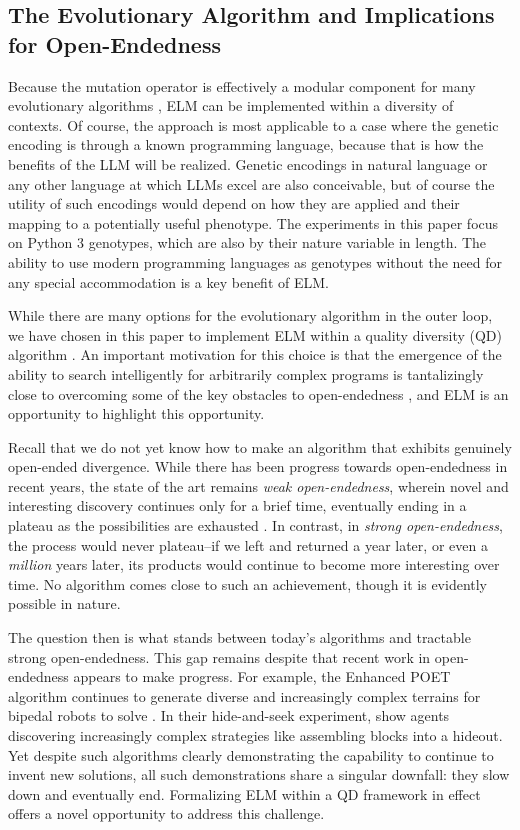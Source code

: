 \documentclass{article}
\begin{document}
\subsection{The Evolutionary Algorithm and Implications for Open-Endedness}

Because the mutation operator is effectively a modular component for many evolutionary algorithms \cite{mitchell:book99,dejong:book06}, ELM can be implemented within a diversity of contexts.  Of course, the approach is most applicable to a case where the genetic encoding is through a known programming language, because that is how the benefits of the LLM will be realized.  Genetic encodings in natural language or any other language at which LLMs excel are also conceivable, but of course the utility of such encodings would depend on how they are applied and their mapping to a potentially useful phenotype. The experiments in this paper focus on Python 3 genotypes, which are also by their nature variable in length.  The ability to use modern programming languages as genotypes without the need for any special accommodation is a key benefit of ELM.

While there are many options for the evolutionary algorithm in the outer loop, we have chosen in this paper to implement ELM within a quality diversity (QD) algorithm \cite{pugh:frontiers16,mouret:arxiv15}.  An important motivation for this choice is that the emergence of the ability to search intelligently for arbitrarily complex programs is tantalizingly close to overcoming some of the key obstacles to open-endedness \cite{stanley:oreilly17}, and ELM is an opportunity to highlight this opportunity.

Recall that we do not yet know how to make an algorithm that
exhibits genuinely open-ended divergence. While there has been progress
towards open-endedness in recent years, the state of the art remains
\emph{weak open-endedness}, wherein novel and interesting discovery continues
only for a brief time, eventually ending in a plateau as the
possibilities are exhausted
\cite{brant:mcc,wang2020enhanced,wang:gecco19,brant:gecco20,stanley:open,baker2019emergent}.
In contrast, in \emph{strong open-endedness}, the process would never
plateau--if we left and returned a year later, or even a \emph{million} years
later, its products would continue to become more interesting over time. No algorithm
comes close to such an achievement, though it is evidently possible in
nature. 

The question then is what stands between today's algorithms and tractable strong
open-endedness.
This gap remains despite that recent work in
open-endedness appears to make progress. For example, the Enhanced POET
algorithm continues to generate diverse and increasingly complex
terrains for bipedal robots to solve \cite{wang2020enhanced}. In their
hide-and-seek experiment, \citet{baker2019emergent} show agents discovering
increasingly complex strategies like assembling blocks into a hideout.
Yet despite such algorithms clearly demonstrating the capability to
continue to invent new solutions, all such demonstrations share a
singular downfall: they slow down and eventually end.
Formalizing ELM within a QD framework in effect offers a novel opportunity to address this challenge.
\end{document}
